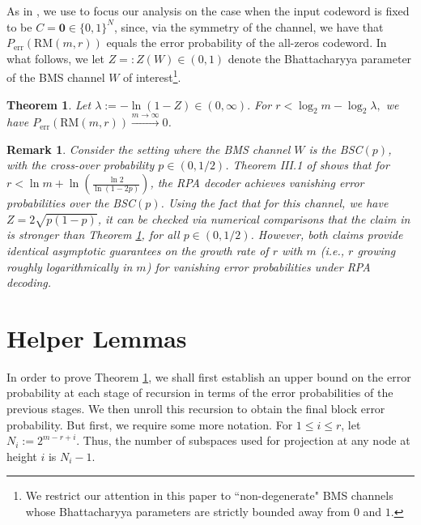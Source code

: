 \documentclass[conference,letterpaper]{IEEEtran}
\newtheorem{theorem}{Theorem}
\newtheorem{remark}{Remark}
\begin{document}
As in \cite{rpa-analysis-isit}, we use \cite[Prop. 2]{rpa} to focus our analysis on the case when the input codeword is fixed to be $C = \mathbf{0}\in \{0,1\}^N$, since, via the symmetry of the channel, we have that $P_\text{err}(\text{RM}(m,r))$ equals the error probability of the all-zeros codeword. In what follows, we let $Z=:Z(W)\in (0,1)$ denote the Bhattacharyya parameter of the BMS channel $W$ of interest\footnote{We restrict our attention in this paper to ``non-degenerate" BMS channels whose Bhattacharyya parameters are strictly bounded away from $0$ and $1$.}.
\begin{theorem}\label{thm:main}
Let
$
\lambda := -\ln(1-Z)\in(0,\infty).
$
For
$
r < \log_2 m -\log_2 \lambda,
$
we have $P_\text{err}(\text{RM}(m,r))\xrightarrow{m\to \infty} 0$.
\end{theorem}
\begin{remark}
    Consider the setting where the BMS channel $W$ is the BSC$(p)$, with the cross-over probability $p\in (0,1/2)$. Theorem III.1 of \cite{rpa-analysis-isit} shows that for $r<\ln m + \ln\left(\frac{\ln 2}{\ln (1-2p)}\right)$, the RPA decoder achieves vanishing error probabilities over the BSC$(p)$. Using the fact that for this channel, we have $Z = 2\sqrt{p(1-p)}$, it can be checked via numerical comparisons that the claim in \cite{rpa-analysis-isit} is stronger than Theorem \ref{thm:main}, for all $p\in (0,1/2)$. However, both claims provide identical asymptotic guarantees on the growth rate of $r$ with $m$ (i.e., $r$ growing roughly logarithmically in $m$) for vanishing error probabilities under RPA decoding.
\end{remark}
\section{Helper Lemmas}
In order to prove Theorem \ref{thm:main}, we shall first establish an upper bound on the error probability at each stage of recursion in terms of the error probabilities of the previous stages.  We then unroll this recursion to obtain the final block error probability. But first, we require some more notation. For $1\leq i\leq r$, let $N_i:= 2^{m-r+i}$. Thus, the number of subspaces used for projection at any node at height $i$ is $N_i-1$.
\end{document}
